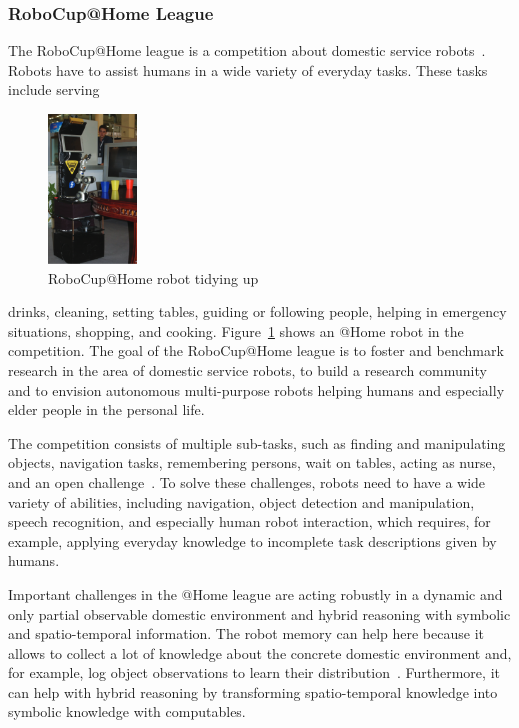 \documentclass[a4paper,11pt]{article}
\newcommand{\reffig}[1]{Figure~\ref{#1}}
\begin{document}
\subsubsection{RoboCup@Home League}
The RoboCup@Home league is a competition about domestic service
robots~\cite{wisspeintner2009robocup}. Robots have to assist
humans in a wide variety of everyday tasks. These tasks include
serving
\begin{figure}
  \centering
  \includegraphics[height=150px]{img/ceasar}%
  \caption{RoboCup@Home robot tidying up~\cite{wisspeintner2009robocup}}
  \vspace{-3mm}
  \label{fig:athome}
\end{figure}
drinks, cleaning, setting tables, guiding or following people,
helping in emergency situations, shopping, and cooking.
\reffig{fig:athome} shows an @Home robot in the
competition.
%
The goal of the RoboCup@Home league is to foster and benchmark
research in the area of domestic service robots, to build a research
community and to envision autonomous multi-purpose robots helping
humans and especially elder people in the personal life.

The competition consists of multiple sub-tasks,
such as finding and manipulating objects, navigation tasks,
remembering persons, wait on tables, acting as
nurse, and an open challenge~\cite{athome-rules}.
To solve these challenges, robots need to
have a wide variety of abilities, including navigation, object
detection and manipulation, speech recognition, and especially human
robot interaction, which requires, for example, applying everyday
knowledge to incomplete task descriptions given by humans.

Important challenges in the @Home league are acting robustly in a
dynamic and only partial observable domestic environment and hybrid
reasoning with symbolic and spatio-temporal information.
The robot memory can help here because it allows to collect a lot
of knowledge about the concrete domestic environment and, for example,
log object observations to learn their distribution~\cite{deebul}.
Furthermore, it can help with hybrid reasoning by transforming
spatio-temporal knowledge into symbolic knowledge with computables.
\end{document}
